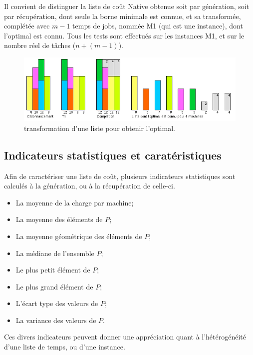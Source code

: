 \documentclass[a4paper,12pt]{report}
\theoremstyle{plain}				%
\theoremstyle{definition}				%
\begin{document}
\bigskip 
Il convient de distinguer la liste de coût Native obtenue 
  soit par génération, 
  soit par récupération, 
  dont seule la borne minimale est connue, 
  et sa transformée, complétée avec $m-1$ temps de jobs, nommée M1 (qui est une instance), 
  dont l'optimal est connu.
Tous les tests sont effectués sur les instances M1, 
  et sur le nombre réel de tâches ($n + (m-1)$).

\begin{figure}
{\centering
\includegraphics[width=\columnwidth]{maitriseOptimal.jpg}
\caption{transformation d'une liste pour obtenir l'optimal.}
\label{ex:maitriseOptimal}
\par}
\end{figure}

\subsection{Indicateurs statistiques et caratéristiques}\label{ssec:instancesIndicateursStatistiquesCaratéristiques}

Afin de caractériser une liste de coût, plusieurs indicateurs statistiques sont calculés à la génération, ou à la récupération de celle-ci.

\begin{itemize}
	\item La moyenne de la charge par machine;
	\item La moyenne des éléments de $P$;
	\item La moyenne géométrique des éléments de $P$;
	\item La médiane de l'ensemble $P$;
	\item Le plus petit élément de $P$;
	\item Le plus grand élément de $P$;
	\item L'écart type des valeurs de $P$;
	\item La variance des valeurs de $P$.
\end{itemize}

Ces divers indicateurs peuvent donner une appréciation quant à 
  l'hétérogénéité d'une liste de temps, ou d'une instance.
\end{document}

